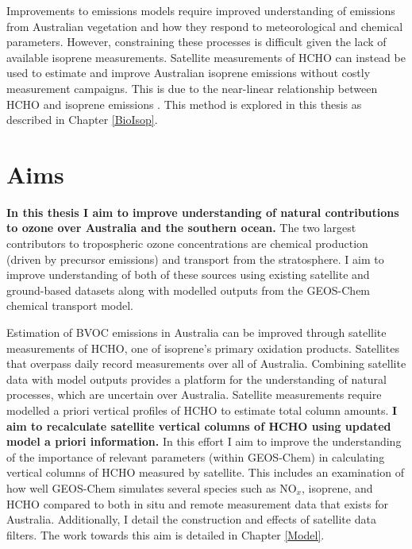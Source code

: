     Improvements to emissions models require improved understanding of emissions from Australian vegetation and how they respond to meteorological and chemical parameters.
    However, constraining these processes is difficult given the lack of available isoprene measurements.
    Satellite measurements of HCHO can instead be used to estimate and improve Australian isoprene emissions without costly measurement campaigns.
    This is due to the near-linear relationship between HCHO and isoprene emissions \parencite[e.g.,][]{Palmer2001, Millet2006, Bauwens2016}.
    This method is explored in this thesis as described in Chapter \ref{BioIsop}.
  

  
\section{Aims}
\label{LR:Aims}

  \textbf{In this thesis I aim to improve understanding of natural contributions to ozone over Australia and the southern ocean.}
  The two largest contributors to tropospheric ozone concentrations are chemical production (driven by precursor emissions) and transport from the stratosphere.
  I aim to improve understanding of both of these sources using existing satellite and ground-based datasets along with modelled outputs from the GEOS-Chem chemical transport model.
  
  Estimation of BVOC emissions in Australia can be improved through satellite measurements of HCHO, one of isoprene's primary oxidation products.
  Satellites that overpass daily record %
  measurements over all of Australia.
  Combining satellite data with model outputs provides a platform for the understanding of natural processes, which are uncertain over Australia.
  Satellite measurements require modelled a priori vertical profiles of HCHO to estimate total column amounts.
  \textbf{I aim to recalculate satellite vertical columns of HCHO using updated model a priori information.}
  In this effort I aim to improve the understanding of the importance of relevant parameters (within GEOS-Chem) in calculating vertical columns of HCHO measured by satellite.
  This includes an examination of how well GEOS-Chem simulates several species such as NO$_x$, isoprene, and HCHO compared to both in situ and remote measurement data that exists for Australia.
  Additionally, I detail the construction and effects of satellite data filters.
  The work towards this aim is detailed in Chapter \ref{Model}.
  
